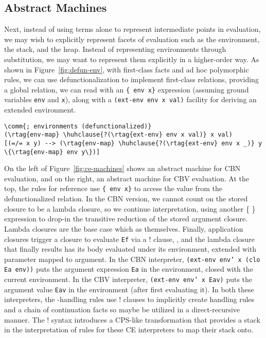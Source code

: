 \subsection{Abstract Machines}
\label{sec:apps:am}
%
Next, instead of using terms alone to represent intermediate points in evaluation, we may wish to explicitly represent facets of evaluation such as the environment, the stack, and the heap. Instead of representing environments through substitution, we may want to represent them explicitly in a higher-order way. As shown in Figure~\ref{fig:defun-env}, with first-class facts and ad hoc polymorphic rules, we can use defunctionalization to implement first-class relations, providing a global  relation, we can read with an \texttt{\{ env x\}} expression (assuming ground variables \texttt{env} and \texttt{x}), along with a \texttt{(ext-env env x val)} facility for deriving an extended environment.
%
\begin{figure*}[h]
\begin{Verbatim}[baselinestretch=0.8,commandchars=\\\{\}]
\comm{; environments (defunctionalized)}
(\rtag{env-map} \huhclause{?(\rtag{ext-env} env x val)} x val)
[(=/= x y) --> (\rtag{env-map} \huhclause{?(\rtag{ext-env} env x _)} y \{\rtag{env-map} env y\})]
\end{Verbatim}
\caption{Defunctionalized environments; extension via \texttt{(ext-env env x v)}, lookup via \texttt{\{env-map env x\}}.}
\label{fig:defun-env}
\end{figure*}


On the left of Figure~\ref{fig:ce-machines} shows an abstract machine for CBN evaluation, and on the right, an abstract machine for CBV evaluation.
%
At the top, the rules for reference use \texttt{\{ env x\}} to access the value from the defunctionalized
 relation. In the CBN version, we cannot count on the stored closure to be a lambda closure, so we continue
interpretation, using another \{ \!\} expression to drop-in the transitive reduction of the stored argument closure.
%
Lambda closures are the base case which  as themselves.
%
Finally, application closures trigger a closure to evaluate \texttt{Ef} via a ! clause, \texttt{}, and the lambda closure that finally results has its body evaluated under its environment, extended with parameter mapped to argument.
%
In the CBN interpreter, \texttt{(ext-env env' x (clo Ea env))} puts the argument expression \texttt{Ea} in the environment, closed with the current environment. In the CBV interpreter, \texttt{(ext-env env' x Eav)} puts the argument value \texttt{Eav} in the environment (after first evaluating it). In both these interpreters, the -handling rules use ! clauses to implicitly create handling rules and a chain of continuation facts so  maybe be utilized in a direct-recursive manner. The ! syntax introduces a CPS-like transformation that provides a stack in the interpretation of \slog{} rules for these CE interpreters to map their stack onto.
%



